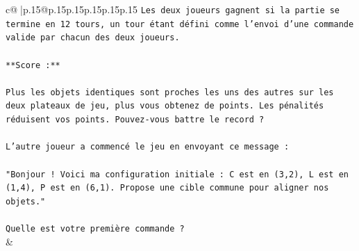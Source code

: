 \documentclass{article}
\begin{document}
{\begin{supertabular}{c@{$\;$}|p{.15\linewidth}@{}p{.15\linewidth}p{.15\linewidth}p{.15\linewidth}p{.15\linewidth}p{.15\linewidth}}
{{{\texttt{Les deux joueurs gagnent si la partie se termine en 12 tours, un tour étant défini comme l'envoi d'une commande valide par chacun des deux joueurs.} \\
\\ 
\texttt{**Score :**} \\
\\ 
\texttt{Plus les objets identiques sont proches les uns des autres sur les deux plateaux de jeu, plus vous obtenez de points. Les pénalités réduisent vos points. Pouvez{-}vous battre le record ?} \\
\\ 
\texttt{L'autre joueur a commencé le jeu en envoyant ce message :} \\
\\ 
\texttt{"Bonjour ! Voici ma configuration initiale : C est en (3,2), L est en (1,4), P est en (6,1). Propose une cible commune pour aligner nos objets."} \\
\\ 
\texttt{Quelle est votre première commande ?} \\
            }
        }
    }
    & \\ \\


\end{supertabular}}
\end{document}
